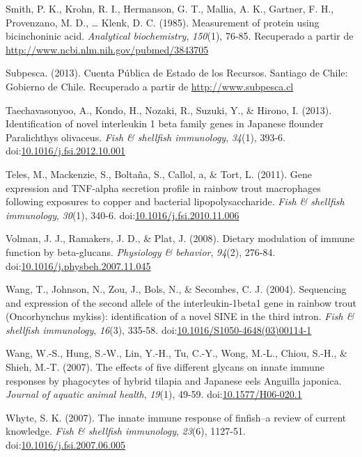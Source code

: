 \documentclass[12pt,letterpaper,oneside]{scrbook}
\begin{document}
Smith, P. K., Krohn, R. I., Hermanson, G. T., Mallia, A. K., Gartner, F.
H., Provenzano, M. D., \ldots{} Klenk, D. C. (1985). Measurement of
protein using bicinchoninic acid. \emph{Analytical biochemistry},
\emph{150}(1), 76-85. Recuperado a partir de
\url{http://www.ncbi.nlm.nih.gov/pubmed/3843705}

Subpesca. (2013). Cuenta Pública de Estado de los Recursos. Santiago de
Chile: Gobierno de Chile. Recuperado a partir de
\url{http://www.subpesca.cl}

Taechavasonyoo, A., Kondo, H., Nozaki, R., Suzuki, Y., \& Hirono, I.
(2013). Identification of novel interleukin 1 beta family genes in
Japanese flounder Paralichthys olivaceus. \emph{Fish \& shellfish
immunology}, \emph{34}(1), 393-6.
doi:\href{http://dx.doi.org/10.1016/j.fsi.2012.10.001}{10.1016/j.fsi.2012.10.001}

Teles, M., Mackenzie, S., Boltaña, S., Callol, a, \& Tort, L. (2011).
Gene expression and TNF-alpha secretion profile in rainbow trout
macrophages following exposures to copper and bacterial
lipopolysaccharide. \emph{Fish \& shellfish immunology}, \emph{30}(1),
340-6.
doi:\href{http://dx.doi.org/10.1016/j.fsi.2010.11.006}{10.1016/j.fsi.2010.11.006}

Volman, J. J., Ramakers, J. D., \& Plat, J. (2008). Dietary modulation
of immune function by beta-glucans. \emph{Physiology \& behavior},
\emph{94}(2), 276-84.
doi:\href{http://dx.doi.org/10.1016/j.physbeh.2007.11.045}{10.1016/j.physbeh.2007.11.045}

Wang, T., Johnson, N., Zou, J., Bols, N., \& Secombes, C. J. (2004).
Sequencing and expression of the second allele of the interleukin-1beta1
gene in rainbow trout (Oncorhynchus mykiss): identification of a novel
SINE in the third intron. \emph{Fish \& shellfish immunology},
\emph{16}(3), 335-58.
doi:\href{http://dx.doi.org/10.1016/S1050-4648(03)00114-1}{10.1016/S1050-4648(03)00114-1}

Wang, W.-S., Hung, S.-W., Lin, Y.-H., Tu, C.-Y., Wong, M.-L., Chiou,
S.-H., \& Shieh, M.-T. (2007). The effects of five different glycans on
innate immune responses by phagocytes of hybrid tilapia and Japanese
eels Anguilla japonica. \emph{Journal of aquatic animal health},
\emph{19}(1), 49-59.
doi:\href{http://dx.doi.org/10.1577/H06-020.1}{10.1577/H06-020.1}

Whyte, S. K. (2007). The innate immune response of finfish--a review of
current knowledge. \emph{Fish \& shellfish immunology}, \emph{23}(6),
1127-51.
doi:\href{http://dx.doi.org/10.1016/j.fsi.2007.06.005}{10.1016/j.fsi.2007.06.005}
\end{document}

